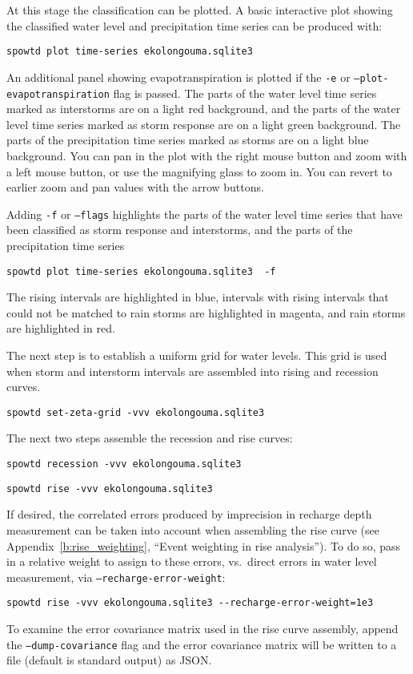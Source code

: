 \documentclass[11pt,a4paper]{article}
\begin{document}
At this stage the classification can be plotted.  A basic interactive
plot showing the classified water level and precipitation time series
can be produced with:
\begin{lstlisting}[frame=single]
spowtd plot time-series ekolongouma.sqlite3
\end{lstlisting}
An additional panel showing evapotranspiration is plotted if the
\texttt{-e} or \texttt{--plot-evapotranspiration} flag is passed.  The
parts of the water level time series marked as interstorms are on a
light red background, and the parts of the water level time series
marked as storm response are on a light green background.  The parts
of the precipitation time series marked as storms are on a light blue
background.  You can pan in the plot with the right mouse button and
zoom with a left mouse button, or use the magnifying glass to zoom in.
You can revert to earlier zoom and pan values with the arrow buttons.

Adding \texttt{-f} or \texttt{--flags} highlights the parts of the
water level time series that have been classified as storm response
and interstorms, and the parts of the precipitation time series
\begin{lstlisting}[frame=single]
spowtd plot time-series ekolongouma.sqlite3  -f
\end{lstlisting}
The rising intervals are highlighted in blue, intervals with rising
intervals that could not be matched to rain storms are highlighted in
magenta, and rain storms are highlighted in red.

The next step is to establish a uniform grid for water levels.  This
grid is used when storm and interstorm intervals are assembled into
rising and recession curves.
\begin{lstlisting}[frame=single]
spowtd set-zeta-grid -vvv ekolongouma.sqlite3
\end{lstlisting}

The next two steps assemble the recession and rise curves:
\begin{lstlisting}[frame=single]
spowtd recession -vvv ekolongouma.sqlite3
\end{lstlisting}

\begin{lstlisting}[frame=single]
spowtd rise -vvv ekolongouma.sqlite3
\end{lstlisting}
If desired, the correlated errors produced by imprecision in recharge
depth measurement can be taken into account when assembling the rise
curve (see Appendix~\ref{b:rise_weighting}, ``Event weighting in rise
analysis'').  To do so, pass in a relative weight to assign to these
errors, vs.\ direct errors in water level measurement, via
\texttt{--recharge-error-weight}:
\begin{lstlisting}[frame=single]
spowtd rise -vvv ekolongouma.sqlite3 --recharge-error-weight=1e3
\end{lstlisting}
To examine the error covariance matrix used in the rise curve
assembly, append the \texttt{--dump-covariance} flag and the error
covariance matrix will be written to a file (default is standard
output) as JSON.
\end{document}
